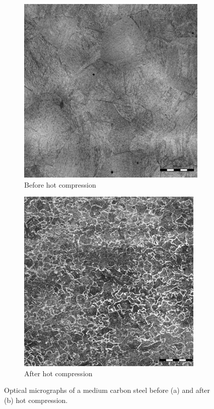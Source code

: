 \documentclass[twoside,english,1p,final,sort&compress]{elsarticle}
\theoremstyle{plain}
\begin{document}
\begin{figure}[!ht]
\centering
\begin{subfigure}[b]{0.45\columnwidth}
\centering
\includegraphics[width=\columnwidth]{Figures/BeforeCompM}
\caption{Before hot compression}
\end{subfigure}
\hfill
\begin{subfigure}[b]{0.45\columnwidth}
\centering
\includegraphics[width=\columnwidth]{Figures/AfterCompM}
\caption{After hot compression}
\end{subfigure}
\caption{Optical micrographs of a medium carbon steel before (a) and after (b) hot compression.}
\label{fig:Micrography}
\end{figure}
\end{document}
